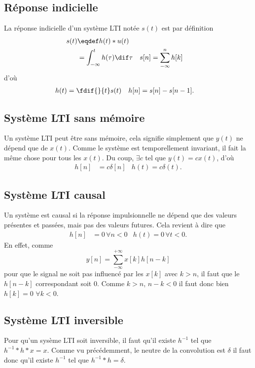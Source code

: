 \subsection{Réponse indicielle}
La réponse indicielle d'un système LTI notée $s(t)$ est par définition
\begin{align*}
  s(t) & \eqdef h(t) * u(t)\\
  & = \int_{-\infty}^t h(\tau) \dif \tau &
  s[n] & = \sum_{-\infty}^n h[k]
\end{align*}
d'où
\begin{align*}
  h(t) & = \fdif{}{t}s(t) & h[n] & = s[n] - s[n-1].
\end{align*}



\subsection{Système LTI sans mémoire}
Un système LTI peut être sans mémoire,
cela signifie simplement que $y(t)$ ne dépend que de $x(t)$.
Comme le système est temporellement invariant,
il fait la même chose pour tous les $x(t)$.
Du coup, $\exists c$ tel que $y(t) = cx(t)$, d'où
\begin{align*}
  h[n] & = c \delta[n] & h(t) = c \delta(t).
\end{align*}

\subsection{Système LTI causal}
Un système est causal si la réponse impulsionnelle ne dépend
que des valeurs présentes et passées, mais pas des valeurs futures.
Cela revient à dire que
\begin{align*}
  h[n] & = 0 \, \forall n < 0  & h(t) = 0 \, \forall t < 0.
\end{align*}
En effet, comme
\[ y[n] = \sum_{-\infty}^{+\infty}x[k]h[n-k] \]
pour que le signal ne soit pas influencé par les $x[k]$ avec
$k > n$, il faut que le $h[n-k]$ correspondant soit 0.
Comme $k > n$, $n - k < 0$ il faut donc bien $h[k] = 0$ $\forall k < 0$.

\subsection{Système LTI inversible}
Pour qu'un sysème LTI soit inversible, il faut qu'il existe $h^{-1}$ tel que
$h^{-1}*h*x = x$.
Comme vu précédemment, le neutre de la convolution est $\delta$ il faut donc
qu'il existe $h^{-1}$ tel que $h^{-1} * h = \delta$.

